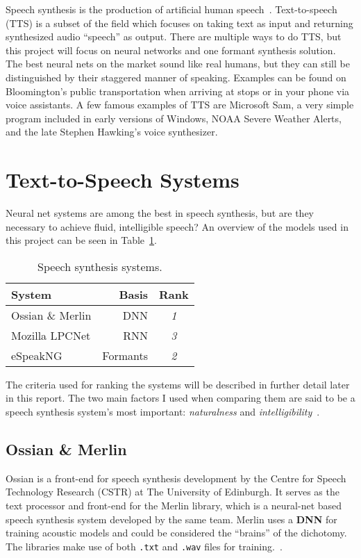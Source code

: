 \documentclass[11pt,a4paper]{article}
\begin{document}
Speech synthesis is the production of artificial human speech~\cite{wiki-speechsynthesis}. Text-to-speech (TTS) is a subset of the field which focuses on taking text as input and returning synthesized audio ``speech'' as output. There are multiple ways to do TTS, but this project will focus on neural networks and one formant synthesis solution. The best neural nets on the market sound like real humans, but they can still be distinguished by their staggered manner of speaking. Examples can be found on Bloomington's public transportation when arriving at stops or in your phone via voice assistants. A few famous examples of TTS are Microsoft Sam, a very simple program included in early versions of Windows, NOAA Severe Weather Alerts, and the late Stephen Hawking's voice synthesizer.

\section{Text-to-Speech Systems}\label{sect:dnn}
Neural net systems are among the best in speech synthesis, but are they necessary to achieve fluid, intelligible speech? An overview of the models used in this project can be seen in Table~\ref{sss-table}.

\begin{table}[t!]
	\begin{center}
		\begin{tabular}{|l|r|c|}
			\hline \bf System & \bf Basis & \bf Rank \\ \hline
			Ossian \& Merlin & DNN & \textit{1} \\
			Mozilla LPCNet & RNN & \textit{3} \\
			eSpeakNG & Formants & \textit{2} \\
			\hline
		\end{tabular}
	\end{center}
\caption{\label{sss-table} Speech synthesis systems. }
\end{table}

The criteria used for ranking the systems will be described in further detail later in this report. The two main factors I used when comparing them are said to be a speech synthesis system's most important: \textit{naturalness} and \textit{intelligibility}~\cite{taylor-tts}.

\subsection{Ossian \& Merlin}\label{sect:ossian}
Ossian is a front-end for speech synthesis development by the Centre for Speech Technology Research (CSTR) at The University of Edinburgh. It serves as the text processor and front-end for the Merlin library, which is a neural-net based speech synthesis system developed by the same team. Merlin uses a \textbf{DNN} for training acoustic models and could be considered the ``brains'' of the dichotomy. The libraries make use of both \texttt{.txt} and \texttt{.wav} files for training.~\cite{ossian-git}.
\end{document}
